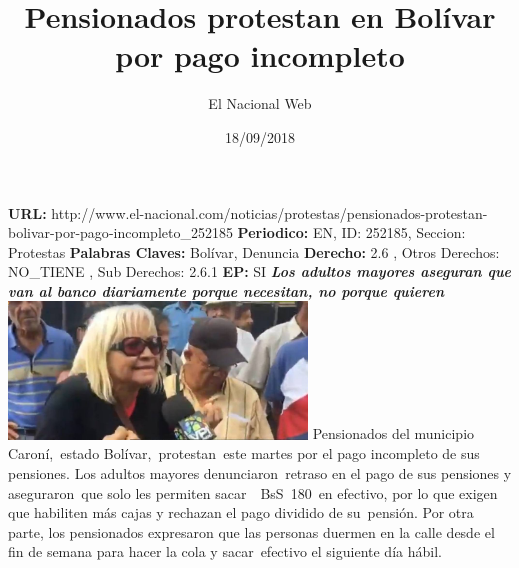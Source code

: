 \documentclass{article}%
\title{\textbf{Pensionados protestan en Bolívar por pago incompleto}}%
\author{El Nacional Web}%
\date{18/09/2018}%
\begin{document}
%
\normalsize%
\maketitle%
\textbf{URL: }%
http://www.el{-}nacional.com/noticias/protestas/pensionados{-}protestan{-}bolivar{-}por{-}pago{-}incompleto\_252185\newline%
%
\textbf{Periodico: }%
EN, %
ID: %
252185, %
Seccion: %
Protestas\newline%
%
\textbf{Palabras Claves: }%
Bolívar, Denuncia\newline%
%
\textbf{Derecho: }%
2.6%
, Otros Derechos: %
NO\_TIENE%
, Sub Derechos: %
2.6.1%
\newline%
%
\textbf{EP: }%
SI\newline%
\newline%
%
\textbf{\textit{Los adultos mayores aseguran que van al banco diariamente porque necesitan, no porque quieren}}%
\newline%
\newline%
%
\includegraphics[width=300px]{198.jpg}%
\newline%
%
Pensionados del municipio Caroní,~estado Bolívar,~protestan~este martes por el pago incompleto de sus pensiones.%
\newline%
%
Los adultos mayores denunciaron~retraso en el pago de sus pensiones y aseguraron~que solo les permiten sacar~~BsS~180~en efectivo, por lo que exigen que habiliten más cajas y rechazan el pago dividido de su~pensión.%
\newline%
%
Por otra parte, los pensionados expresaron que las personas duermen en la calle desde el fin de semana para hacer la cola y sacar~efectivo el siguiente día hábil.%
\newline%
%
\end{document}
